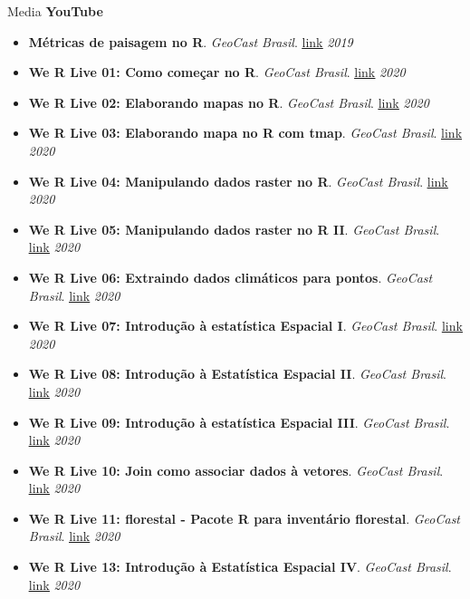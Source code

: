 \documentclass{resume}
\begin{document}
\begin{rSection}{Media}
\textbf{YouTube}
\begin{itemize} 
\item \textbf{Métricas de paisagem no R}. \textit{GeoCast Brasil}. \href{https://youtu.be/RCTrLx_33D8}{\underline{link}} \hfill{\em 2019}
\item \textbf{We R Live 01: Como começar no R}. \textit{GeoCast Brasil}. \href{https://youtu.be/ZORFVdwtJ1U}{\underline{link}} \hfill{\em 2020}
\item \textbf{We R Live 02: Elaborando mapas no R}. \textit{GeoCast Brasil}. \href{https://youtu.be/eHht0n3Ppcg}{\underline{link}} \hfill{\em 2020}
\item \textbf{We R Live 03: Elaborando mapa no R com tmap}. \textit{GeoCast Brasil}. \href{https://youtu.be/BmlM25XQ3QA}{\underline{link}} \hfill{\em 2020}
\item \textbf{We R Live 04: Manipulando dados raster no R}. \textit{GeoCast Brasil}. \href{https://youtu.be/dFC9SuGLuX8}{\underline{link}} \hfill{\em 2020}
\item \textbf{We R Live 05: Manipulando dados raster no R II}. \textit{GeoCast Brasil}. \href{https://youtu.be/AKJo_Q0dsMI}{\underline{link}} \hfill{\em 2020}
\item \textbf{We R Live 06: Extraindo dados climáticos para pontos}. \textit{GeoCast Brasil}. \href{https://youtu.be/-_ODMFDU6ck}{\underline{link}} \hfill{\em 2020}
\item \textbf{We R Live 07: Introdução à estatística Espacial I}. \textit{GeoCast Brasil}. \href{https://youtu.be/fHWD4qyKj84}{\underline{link}} \hfill{\em 2020}
\item \textbf{We R Live 08: Introdução à Estatística Espacial II}. \textit{GeoCast Brasil}. \href{https://youtu.be/BCl_V-SpQec}{\underline{link}} \hfill{\em 2020}
\item \textbf{We R Live 09: Introdução à estatística Espacial III}. \textit{GeoCast Brasil}. \href{https://youtu.be/eaR7pTsQFDQ}{\underline{link}} \hfill{\em 2020}
\item \textbf{We R Live 10: Join como associar dados à vetores}. \textit{GeoCast Brasil}. \href{https://youtu.be/BvURukaIDM0}{\underline{link}} \hfill{\em 2020}
\item \textbf{We R Live 11: florestal - Pacote R para inventário florestal}. \textit{GeoCast Brasil}. \href{https://youtu.be/xOgsVywKADI}{\underline{link}} \hfill{\em 2020}
\item \textbf{We R Live 13: Introdução à Estatística Espacial IV}. \textit{GeoCast Brasil}. \href{https://youtu.be/IsOJvaWdyXE}{\underline{link}} \hfill{\em 2020}

\end{itemize}
\end{rSection}
\end{document}
